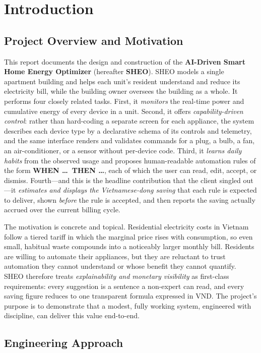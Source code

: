 \chapter{Introduction}

\section{Project Overview and Motivation}

This report documents the design and construction of the \textbf{AI-Driven Smart
Home Energy Optimizer} (hereafter \textbf{SHEO}). SHEO models a single
apartment building and helps each unit's resident understand and reduce its electricity
bill, while the building owner oversees the building as a whole. It performs four closely
related tasks. First, it \emph{monitors} the real-time power and cumulative energy of every
device in a unit. Second, it offers \emph{capability-driven control}: rather than hard-coding a
separate screen for each appliance, the system describes each device type by a
declarative schema of its controls and telemetry, and the same interface renders and
validates commands for a plug, a bulb, a fan, an air-conditioner, or a sensor without
per-device code. Third, it \emph{learns daily habits} from the observed usage and
proposes human-readable automation rules of the form \textbf{WHEN \dots\ THEN \dots},
each of which the user can read, edit, accept, or dismiss. Fourth---and this is the
headline contribution that the client singled out---it \emph{estimates and displays the
Vietnamese-dong saving} that each rule is expected to deliver, shown \emph{before} the
rule is accepted, and then reports the saving actually accrued over the current billing
cycle.

The motivation is concrete and topical. Residential electricity costs in Vietnam follow
a tiered tariff in which the marginal price rises with consumption, so even small,
habitual waste compounds into a noticeably larger monthly bill. Residents are willing
to automate their appliances, but they are reluctant to trust automation they cannot
understand or whose benefit they cannot quantify. SHEO therefore treats
\emph{explainability and monetary visibility} as first-class requirements: every
suggestion is a sentence a non-expert can read, and every saving figure reduces to one
transparent formula expressed in VND. The project's purpose is to demonstrate that a
modest, fully working system, engineered with discipline, can deliver this value
end-to-end.

\section{Engineering Approach}

